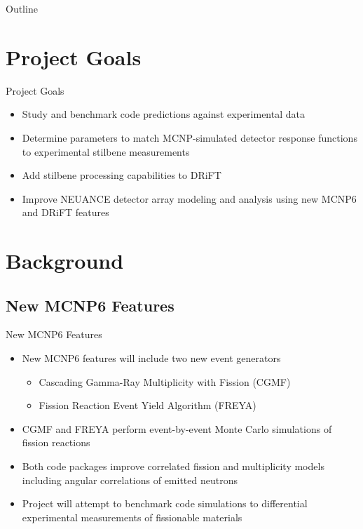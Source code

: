\documentclass{beamer}
\begin{document}



\begin{frame}{Outline}
\tableofcontents
\end{frame}

\section{Project Goals}
\begin{frame}{Project Goals}
\begin{itemize}
\item Study and benchmark code predictions against experimental data
\item Determine parameters to match MCNP-simulated detector response functions to experimental stilbene measurements
\item Add stilbene processing capabilities to DRiFT
\item Improve NEUANCE detector array modeling and analysis using new MCNP6 and DRiFT features
\end{itemize}
\end{frame}


\section{Background}
\begin{frame}
\sectionpage
\end{frame}

\subsection{New MCNP6 Features}
\begin{frame}{New MCNP6 Features}
\begin{itemize}
\item New MCNP6 features will include two new event generators
\begin{itemize}
\item Cascading Gamma-Ray Multiplicity with Fission (CGMF)
\item Fission Reaction Event Yield Algorithm (FREYA)
\end{itemize}
\item CGMF and FREYA perform event-by-event Monte Carlo simulations of fission reactions
\item Both code packages improve correlated fission and multiplicity models including angular correlations of emitted neutrons
\item Project will attempt to benchmark code simulations to differential experimental measurements of fissionable materials
\end{itemize}
\end{frame}
\end{document}
